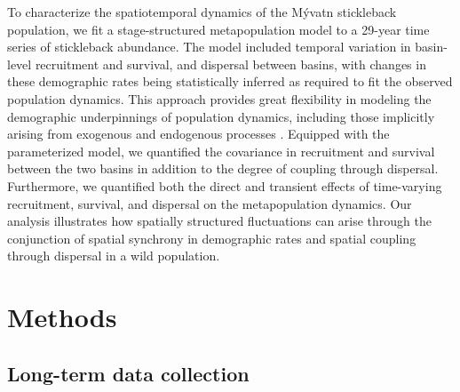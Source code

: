 \documentclass[11pt]{article}
\begin{document}
To characterize the spatiotemporal dynamics of the M\'{y}vatn stickleback population, 
we fit a stage-structured metapopulation model \citep{caswell2001matrix}
to a 29-year time series of stickleback abundance.
The model included temporal variation in basin-level recruitment and survival, 
and dispersal between basins,
with changes in these demographic rates being statistically inferred 
as required to fit the observed population dynamics.
This approach provides great flexibility in modeling the demographic underpinnings of 
population dynamics,
including those implicitly arising from exogenous and endogenous processes
\citep{zeng1998, ives2012}.
Equipped with the parameterized model, 
we quantified the covariance in recruitment and survival between the two basins
in addition to the degree of coupling through dispersal.
Furthermore, we quantified both the direct and transient effects of 
time-varying recruitment, survival, and dispersal
on the metapopulation dynamics.
Our analysis illustrates how spatially structured fluctuations  
can arise through the conjunction of spatial synchrony in demographic rates
and spatial coupling through dispersal in a wild population. 





\section*{Methods} 



\subsection*{Long-term data collection} 
\end{document}
